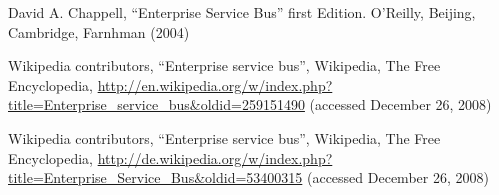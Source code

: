 %
%

%
% 
% 
%
\begin{thebibliography}{}
%
%
%
 David A. Chappell,
``Enterprise Service Bus'' first Edition. 
O'Reilly, Beijing, Cambridge, Farnhman (2004)

Wikipedia contributors,
``Enterprise service bus'',
Wikipedia, The Free Encyclopedia,
\url{http://en.wikipedia.org/w/index.php?title=Enterprise_service_bus&oldid=259151490}
(accessed December 26, 2008)

Wikipedia contributors,
``Enterprise service bus'',
Wikipedia, The Free Encyclopedia,
\url{http://de.wikipedia.org/w/index.php?title=Enterprise_Service_Bus&oldid=53400315}
(accessed December 26, 2008)

\end{thebibliography}
